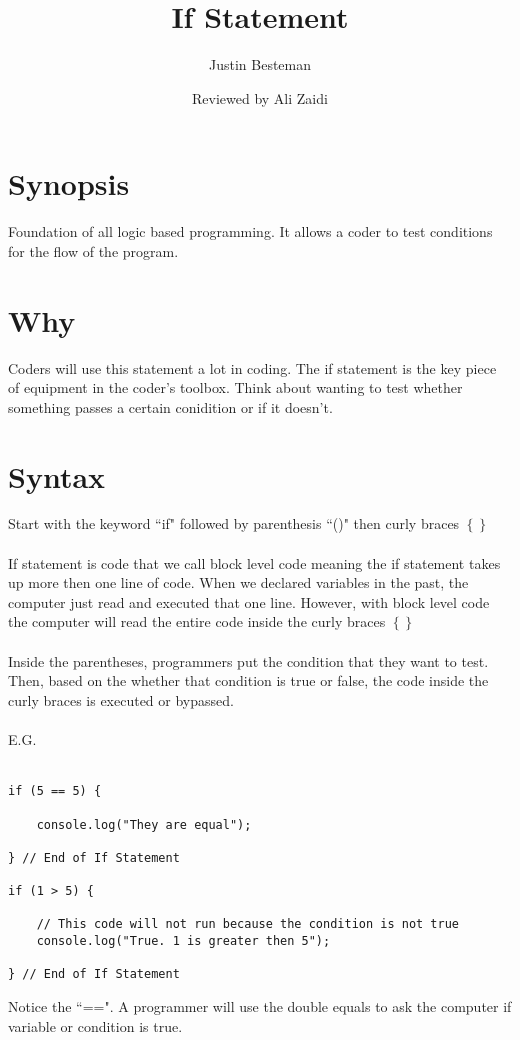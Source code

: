 \documentclass[12pt, letterpaper]{article}
\title{If Statement}
\author{Justin Besteman}
\date{Reviewed by Ali Zaidi}
\begin{document}
\maketitle


\section*{Synopsis}

Foundation of all logic based programming. It allows a coder to test conditions for the flow of the program.

\section*{Why}

Coders will use this statement a lot in coding. The if statement is the key piece of equipment in the coder's toolbox. Think about wanting to test whether something passes a certain conidition or if it doesn't.

\section*{Syntax}

Start with the keyword ``if" followed by parenthesis ``()" then curly braces $\left\{\right\}$ \\ \\
If statement is code that we call block level code meaning the if statement takes up more then one line of code. When we declared variables in the past, the computer just read and executed that one line. However, with block level code the computer will read the entire code inside the curly braces $\left\{\right\}$ \\ \\
Inside the parentheses, programmers put the condition that they want to test. Then, based on the whether that condition is true or false, the code inside the curly braces is executed or bypassed. \\ \\
E.G.\\ \\
\begin{lstlisting}
if (5 == 5) {

	console.log("They are equal");

} // End of If Statement

if (1 > 5) {

	// This code will not run because the condition is not true
	console.log("True. 1 is greater then 5");

} // End of If Statement
\end{lstlisting}
Notice the  ``==". A programmer will use the double equals to ask the computer if variable or condition is true. 
\end{document}
